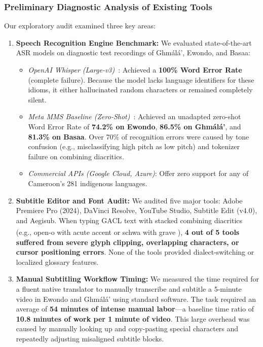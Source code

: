 \documentclass[a4paper,11pt]{article}
\begin{document}
\subsubsection{Preliminary Diagnostic Analysis of Existing Tools}
Our exploratory audit examined three key areas:
\begin{enumerate}
    \item \textbf{Speech Recognition Engine Benchmark:} We evaluated state-of-the-art ASR models on diagnostic test recordings of Gh\textopeno m\'al\'a', Ewondo, and Basaa:
    \begin{itemize}
        \item \textit{OpenAI Whisper (Large-v3)}~\cite{radford2023robust}: Achieved a \textbf{100\% Word Error Rate} (complete failure). Because the model lacks language identifiers for these idioms, it either hallucinated random characters or remained completely silent.
        \item \textit{Meta MMS Baseline (Zero-Shot)}~\cite{pratap2024scaling}: Achieved an unadapted zero-shot Word Error Rate of \textbf{74.2\% on Ewondo}, \textbf{86.5\% on Gh\textopeno m\'al\'a'}, and \textbf{81.3\% on Basaa}. Over 70\% of recognition errors were caused by tone confusion (e.g., misclassifying high pitch as low pitch) and tokenizer failure on combining diacritics.
        \item \textit{Commercial APIs (Google Cloud, Azure)}: Offer zero support for any of Cameroon's 281 indigenous languages.
    \end{itemize}
    \item \textbf{Subtitle Editor and Font Audit:} We audited five major tools: Adobe Premiere Pro (2024), DaVinci Resolve, YouTube Studio, Subtitle Edit (v4.0), and Aegisub. When typing GACL text with stacked combining diacritics (e.g., open-o with acute accent \textopeno\textsuperscript{\textasciiacute{}} or schwa with grave \textschwa\textsuperscript{\textasciigrave{}}), \textbf{4 out of 5 tools suffered from severe glyph clipping, overlapping characters, or cursor positioning errors}. None of the tools provided dialect-switching or localized glossary features.
    \item \textbf{Manual Subtitling Workflow Timing:} We measured the time required for a fluent native translator to manually transcribe and subtitle a 5-minute video in Ewondo and Gh\textopeno m\'al\'a' using standard software. The task required an average of \textbf{54 minutes of intense manual labor}—a baseline time ratio of \textbf{10.8 minutes of work per 1 minute of video}. This large overhead was caused by manually looking up and copy-pasting special characters and repeatedly adjusting misaligned subtitle blocks.
\end{enumerate}
\end{document}
